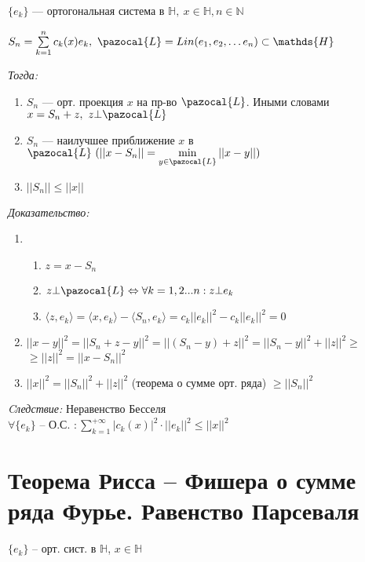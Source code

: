 \documentclass[paper=a4, fontsize=14pt]{report}
\begin{document}
$\{e_k\}$ {{---}} ортогональная система в $\mathds{H},\ x \in \mathds{H}, n \in \mathbb{N}$

$S_n = \sum\limits_{k=1}^{n} c_k(x)e_k,\ \pazocal{L} = Lin(e_1, e_2, \ldots e_n) \subset \mathds{H}$

\emph{Тогда:}

\begin{enumerate}

	\item $S_n$ {{---}} орт. проекция $x$ на пр-во $\pazocal{L}$. Иными словами $x = S_n + z,\ z \bot \pazocal{L}$

	\item $S_n$ {{---}} наилучшее приближение $x$ в $\pazocal{L}\ (||x - S_n|| = \min\limits_{y \in \pazocal{L}} ||x - y||)$

	\item $||S_n|| \leqslant ||x||$

\end{enumerate}

\emph{Доказательство:}

\begin{enumerate}

	\item
	\begin{enumerate}
		\item $z = x - S_n$

		\item $z \bot \pazocal{L} \Leftrightarrow \forall k = 1, 2 ...n : z \bot e_k$

		\item $\langle z, e_k \rangle = \langle x, e_k \rangle - \langle S_n, e_k \rangle = c_k ||e_k||^2 - c_k ||e_k||^2 = 0$
	\end{enumerate}

	\item $||x - y||^2 = ||S_n + z - y||^2 = ||(S_n - y) + z||^2 = ||S_n - y||^2 + ||z||^2 \geqslant$ $\geqslant ||z||^2 = ||x - S_n||^2$

	\item $||x||^2 = ||S_n||^2 + ||z||^2$ (теорема о сумме орт. ряда) $\geqslant ||S_n||^2$
\end{enumerate}

\emph{Cледствие:} Неравенство Бесселя\\

$\forall \{e_k\}$ {{--}} О.С. $:\sum\limits_{k=1}^{+\infty} |c_k(x)|^2 \cdot ||e_k||^2 \leqslant ||x||^2$

\section{Теорема Рисса -- Фишера о сумме ряда Фурье. Равенство Парсеваля}
$\{e_k\}$ -- орт. сист. в $\mathds{H}$, $x \in \mathds{H}$\\
\end{document}

